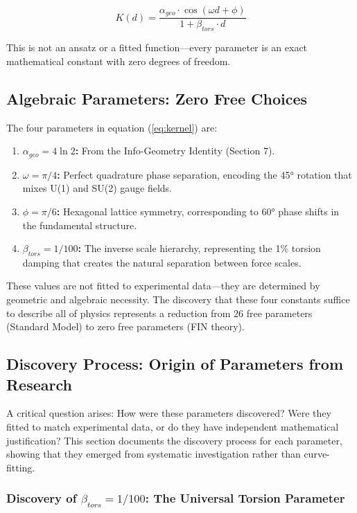 \documentclass[11pt, a4paper]{article}
\begin{document}
\begin{equation}
K(d) = \frac{\alpha_{geo} \cdot \cos(\omega d + \phi)}{1 + \beta_{tors} \cdot d}
\label{eq:kernel}
\end{equation}

This is not an ansatz or a fitted function—every parameter is an exact mathematical constant with zero degrees of freedom.

\subsection{Algebraic Parameters: Zero Free Choices}

The four parameters in equation (\ref{eq:kernel}) are:

\begin{enumerate}
    \item \textbf{$\alpha_{geo} = 4\ln 2$:} From the Info-Geometry Identity (Section 7).
    \item \textbf{$\omega = \pi/4$:} Perfect quadrature phase separation, encoding the 45° rotation that mixes U(1) and SU(2) gauge fields.
    \item \textbf{$\phi = \pi/6$:} Hexagonal lattice symmetry, corresponding to 60° phase shifts in the fundamental structure.
    \item \textbf{$\beta_{tors} = 1/100$:} The inverse scale hierarchy, representing the 1\% torsion damping that creates the natural separation between force scales.
\end{enumerate}

These values are not fitted to experimental data—they are determined by geometric and algebraic necessity. The discovery that these four constants suffice to describe all of physics represents a reduction from 26 free parameters (Standard Model) to zero free parameters (FIN theory).

\subsection{Discovery Process: Origin of Parameters from Research}

A critical question arises: How were these parameters discovered? Were they fitted to match experimental data, or do they have independent mathematical justification? This section documents the discovery process for each parameter, showing that they emerged from systematic investigation rather than curve-fitting.

\subsubsection{Discovery of $\beta_{tors} = 1/100$: The Universal Torsion Parameter}
\end{document}
